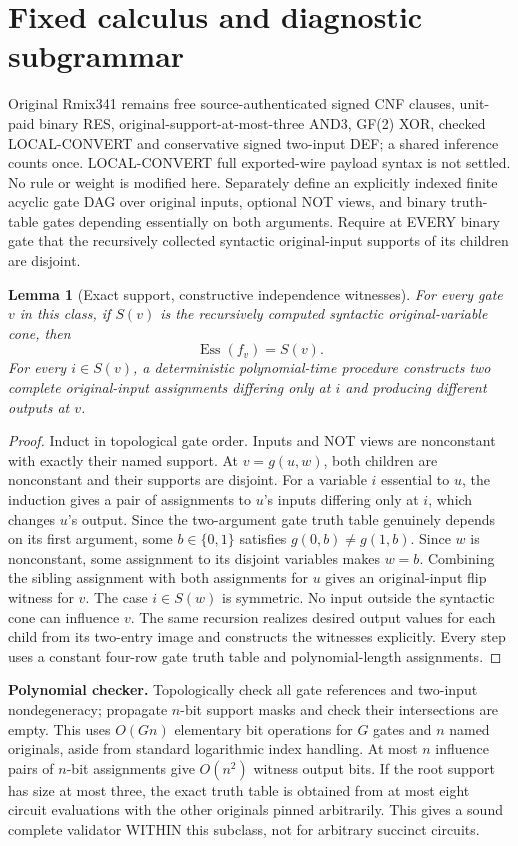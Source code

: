 \documentclass[11pt]{article}
\newtheorem{lemma}{Lemma}
\begin{document}
\section*{Fixed calculus and diagnostic subgrammar}
Original Rmix341 remains free source-authenticated signed CNF clauses, unit-paid binary RES, original-support-at-most-three AND3, GF(2) XOR, checked LOCAL-CONVERT and conservative signed two-input DEF; a shared inference counts once. LOCAL-CONVERT full exported-wire payload syntax is not settled. No rule or weight is modified here.
Separately define an explicitly indexed finite acyclic gate DAG over original inputs, optional NOT views, and binary truth-table gates depending essentially on both arguments. Require at EVERY binary gate that the recursively collected syntactic original-input supports of its children are disjoint.

\begin{lemma}[Exact support, constructive independence witnesses]
For every gate \(v\) in this class, if \(S(v)\) is the recursively computed syntactic original-variable cone, then
\[
\boxed{\operatorname{Ess}(f_v)=S(v).}
\]
For every \(i\in S(v)\), a deterministic polynomial-time procedure constructs two complete original-input assignments differing only at \(i\) and producing different outputs at \(v\).
\end{lemma}
\begin{proof}
Induct in topological gate order. Inputs and NOT views are nonconstant with exactly their named support. At \(v=g(u,w)\), both children are nonconstant and their supports are disjoint. For a variable \(i\) essential to \(u\), the induction gives a pair of assignments to \(u\)'s inputs differing only at \(i\), which changes \(u\)'s output. Since the two-argument gate truth table genuinely depends on its first argument, some \(b\in\{0,1\}\) satisfies \(g(0,b)\ne g(1,b)\). Since \(w\) is nonconstant, some assignment to its disjoint variables makes \(w=b\). Combining the sibling assignment with both assignments for \(u\) gives an original-input flip witness for \(v\). The case \(i\in S(w)\) is symmetric. No input outside the syntactic cone can influence \(v\). The same recursion realizes desired output values for each child from its two-entry image and constructs the witnesses explicitly. Every step uses a constant four-row gate truth table and polynomial-length assignments.
\end{proof}

\noindent\textbf{Polynomial checker.} Topologically check all gate references and two-input nondegeneracy; propagate \(n\)-bit support masks and check their intersections are empty. This uses \(O(Gn)\) elementary bit operations for \(G\) gates and \(n\) named originals, aside from standard logarithmic index handling. At most \(n\) influence pairs of \(n\)-bit assignments give \(O(n^2)\) witness output bits. If the root support has size at most three, the exact truth table is obtained from at most eight circuit evaluations with the other originals pinned arbitrarily. This gives a sound complete validator WITHIN this subclass, not for arbitrary succinct circuits.
\end{document}
